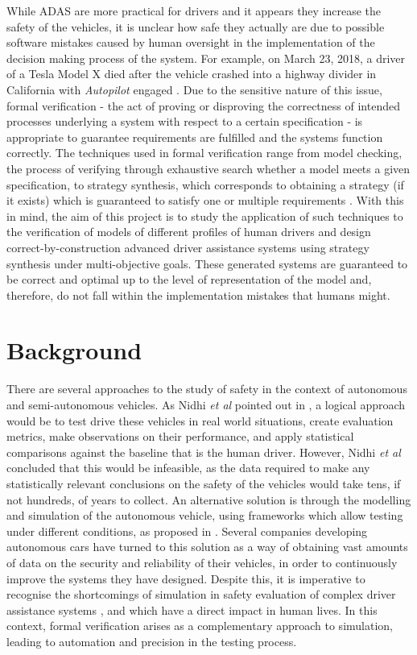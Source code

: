 \documentclass[a4paper]{article}
\begin{document}
While ADAS are more practical for drivers and it appears they increase the safety of the vehicles, it is unclear how safe they actually are due to possible software mistakes caused by human oversight in the implementation of the decision making process of the system. For example, on March 23, 2018, a driver of a Tesla Model X died after the vehicle crashed into a highway divider in California with \textit{Autopilot} engaged \cite{autopilot2}. Due to the sensitive nature of this issue, formal verification - the act of proving or disproving the correctness of intended processes underlying a system with respect to a certain specification \cite{fv-wiki} - is appropriate to guarantee requirements are fulfilled and the systems function correctly. The techniques used in formal verification range from model checking, the process of verifying through exhaustive search whether a model meets a given specification, to strategy synthesis, which corresponds to obtaining a strategy (if it exists) which is guaranteed to satisfy one or multiple requirements \cite{fv-wiki}. With this in mind, the aim of this project is to study the application of such techniques to the verification of models of different profiles of human drivers and design correct-by-construction advanced driver assistance systems using strategy synthesis under multi-objective goals. These generated systems are guaranteed to be correct and optimal up to the level of representation of the model and, therefore, do not fall within the implementation mistakes that humans might. 

\section{Background}

There are several approaches to the study of safety in the context of autonomous and semi-autonomous vehicles. As Nidhi \textit{et al} pointed out in \cite{driving-to-safety}, a logical approach would be to test drive these vehicles in real world situations, create evaluation metrics, make observations on their performance, and apply statistical comparisons against the baseline that is the human driver. However, Nidhi \textit{et al} concluded that this would be infeasible, as the data required to make any statistically relevant conclusions on the safety of the vehicles would take tens, if not hundreds, of years to collect. An alternative solution is through the modelling and simulation of the autonomous vehicle, using frameworks which allow testing under different conditions, as proposed in \cite{sim1, sim2, sim3, sim4}. Several companies developing autonomous cars have turned to this solution as a way of obtaining vast amounts of data on the security and reliability of their vehicles, in order to continuously improve the systems they have designed. Despite this, it is imperative to recognise the shortcomings of simulation in safety evaluation of complex driver assistance systems \cite{challenges1, challenges2}, and which have a direct impact in human lives. In this context, formal verification arises as a complementary approach to simulation, leading to automation and precision in the testing process.
\end{document}
